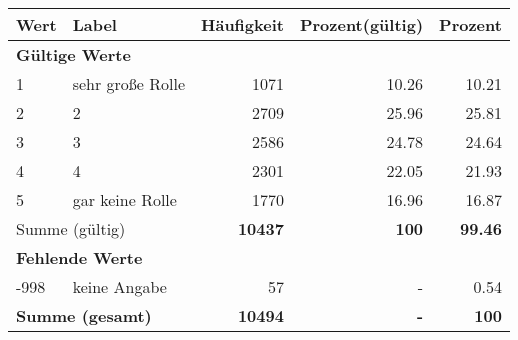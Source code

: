      \begin{longtable}{lXrrr}
     \toprule
     \textbf{Wert} & \textbf{Label} & \textbf{Häufigkeit} & \textbf{Prozent(gültig)} & \textbf{Prozent} \\
     \endhead
     \midrule
     \multicolumn{5}{l}{\textbf{Gültige Werte}}\\

     1 &
     \multicolumn{1}{X}{ sehr große Rolle   } &


       \num{1071} &
       \num[round-mode=places,round-precision=2]{10,26} &
         \num[round-mode=places,round-precision=2]{10,21} \\

     2 &
     \multicolumn{1}{X}{ 2   } &


       \num{2709} &
       \num[round-mode=places,round-precision=2]{25,96} &
         \num[round-mode=places,round-precision=2]{25,81} \\

     3 &
     \multicolumn{1}{X}{ 3   } &


       \num{2586} &
       \num[round-mode=places,round-precision=2]{24,78} &
         \num[round-mode=places,round-precision=2]{24,64} \\

     4 &
     \multicolumn{1}{X}{ 4   } &


       \num{2301} &
       \num[round-mode=places,round-precision=2]{22,05} &
         \num[round-mode=places,round-precision=2]{21,93} \\

     5 &
     \multicolumn{1}{X}{ gar keine Rolle   } &


       \num{1770} &
       \num[round-mode=places,round-precision=2]{16,96} &
         \num[round-mode=places,round-precision=2]{16,87} \\
     \midrule
     \multicolumn{2}{l}{Summe (gültig)} &
       \textbf{\num{10437}} &
     \textbf{100} &
       \textbf{\num[round-mode=places,round-precision=2]{99,46}} \\
     \multicolumn{5}{l}{\textbf{Fehlende Werte}}\\
       -998 &
       keine Angabe &
         \num{57} &
        - &
         \num[round-mode=places,round-precision=2]{0,54} \\
     \midrule
     \multicolumn{2}{l}{\textbf{Summe (gesamt)}} &
          \textbf{\num{10494}} &
        \textbf{-} &
        \textbf{100} \\
     \bottomrule
     \end{longtable}
     
